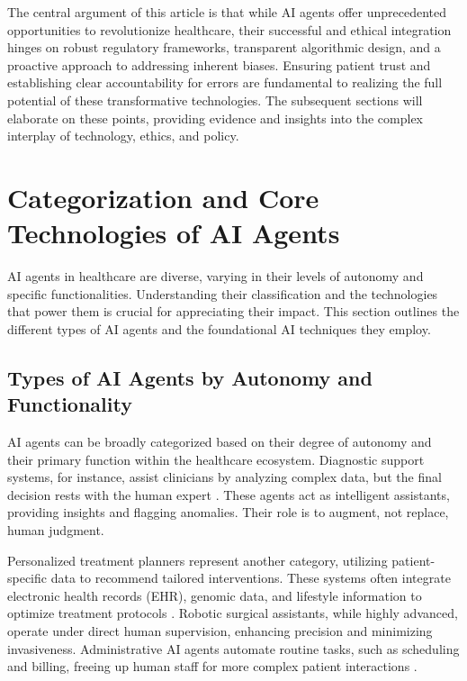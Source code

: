 \documentclass[12pt,a4paper]{article}
\begin{document}
The central argument of this article is that while AI agents offer unprecedented opportunities to revolutionize healthcare, their successful and ethical integration hinges on robust regulatory frameworks, transparent algorithmic design, and a proactive approach to addressing inherent biases. Ensuring patient trust and establishing clear accountability for errors are fundamental to realizing the full potential of these transformative technologies. The subsequent sections will elaborate on these points, providing evidence and insights into the complex interplay of technology, ethics, and policy.

\section{Categorization and Core Technologies of AI Agents}
\label{sec:categorization}
AI agents in healthcare are diverse, varying in their levels of autonomy and specific functionalities. Understanding their classification and the technologies that power them is crucial for appreciating their impact. This section outlines the different types of AI agents and the foundational AI techniques they employ.

\subsection{Types of AI Agents by Autonomy and Functionality}
\label{sec:agent_types}
AI agents can be broadly categorized based on their degree of autonomy and their primary function within the healthcare ecosystem. Diagnostic support systems, for instance, assist clinicians by analyzing complex data, but the final decision rests with the human expert \cite{topol2019highperformance}. These agents act as intelligent assistants, providing insights and flagging anomalies. Their role is to augment, not replace, human judgment.

Personalized treatment planners represent another category, utilizing patient-specific data to recommend tailored interventions. These systems often integrate electronic health records (EHR), genomic data, and lifestyle information to optimize treatment protocols \cite{davenport2019ai}. Robotic surgical assistants, while highly advanced, operate under direct human supervision, enhancing precision and minimizing invasiveness. Administrative AI agents automate routine tasks, such as scheduling and billing, freeing up human staff for more complex patient interactions \cite{who2021ai}.
\end{document}
